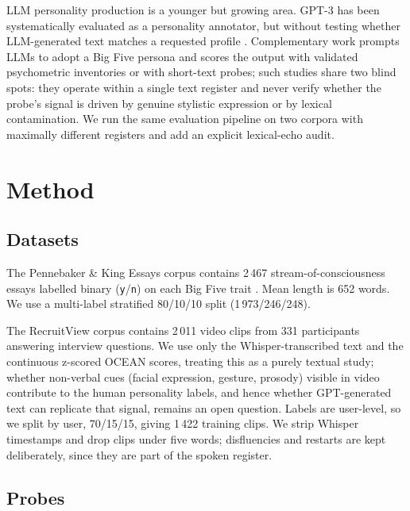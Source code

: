 \documentclass[10pt, a4paper]{article}
\begin{document}
LLM personality production is a younger but growing area. GPT-3 has been systematically evaluated as a personality annotator, but without testing whether LLM-generated text matches a requested profile \citep{v-ganesan-etal-2023-systematic}. Complementary work prompts LLMs to adopt a Big Five persona and scores the output with validated psychometric inventories or with short-text probes; such studies share two blind spots: they operate within a single text register and never verify whether the probe's signal is driven by genuine stylistic expression or by lexical contamination. We run the same evaluation pipeline on two corpora with maximally different registers and add an explicit lexical-echo audit.

\section{Method}

\subsection{Datasets}

The Pennebaker \& King Essays corpus contains 2\,467 stream-of-consciousness essays labelled binary (\texttt{y}/\texttt{n}) on each Big Five trait \citep{goldberg-1990-bigfive}. Mean length is 652 words. We use a multi-label stratified 80/10/10 split (1\,973/246/248).

The RecruitView corpus \citep{gupta-etal-2025-recruitview} contains 2\,011 video clips from 331 participants answering interview questions. We use only the Whisper-transcribed \citep{radford-etal-2022-whisper} text and the continuous z-scored OCEAN scores, treating this as a purely textual study; whether non-verbal cues (facial expression, gesture, prosody) visible in video contribute to the human personality labels, and hence whether GPT-generated text can replicate that signal, remains an open question. Labels are user-level, so we split by user, 70/15/15, giving 1\,422 training clips. We strip Whisper timestamps and drop clips under five words; disfluencies and restarts are kept deliberately, since they are part of the spoken register.

\subsection{Probes}
\end{document}
